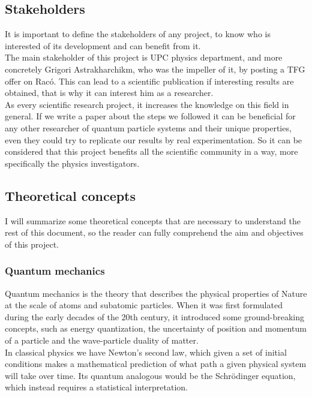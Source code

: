 \documentclass{article}
\begin{document}
\subsection{Stakeholders}
It is important to define the stakeholders of any project, to know who is interested of its 
development and can benefit from it.\\

The main stakeholder of this project is UPC physics department, and more concretely Grigori 
Astrakharchikm, who was the impeller of it, by posting a TFG offer on Racó. This can lead to 
a scientific publication if interesting results are obtained, that is why it can interest him 
as a researcher.\\

As every scientific research project, it increases the knowledge on this field in general. If 
we write a paper about the steps we followed it can be beneficial for any other researcher of 
quantum particle systems and their unique properties, even they could try to replicate our 
results by real experimentation. So it can be considered that this project benefits all the 
scientific community in a way, more specifically the physics investigators.  


\subsection{Theoretical concepts}
I will summarize some theoretical concepts that are necessary to understand the rest of this 
document, so the reader can fully comprehend the aim and objectives of this project.

\subsubsection{Quantum mechanics}
Quantum mechanics is the theory that describes the physical properties of Nature at the scale 
of atoms and subatomic particles. When it was first formulated during the early decades of the 
20th century, it introduced some ground-breaking concepts, such as energy quantization, the 
uncertainty of position and momentum of a particle and the wave-particle duality of matter.\\

In classical physics we have Newton’s second law, which given a set of initial conditions 
makes a mathematical prediction of what path a given physical system will take over time. 
Its quantum analogous would be the Schrödinger equation, which instead requires a statistical 
interpretation.
\end{document}
